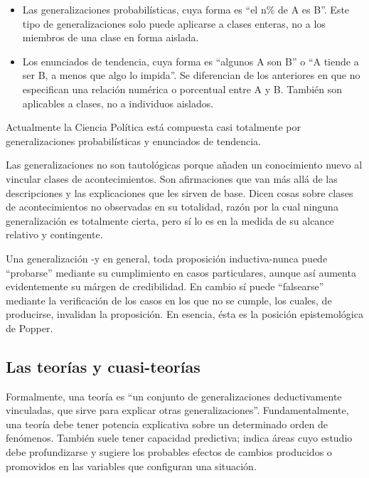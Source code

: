 \documentclass[
]{book}
\begin{document}
\begin{itemize}
\item
  Las generalizaciones probabilísticas, cuya forma es ``el n\% de A es B''. Este tipo de generalizaciones solo puede aplicarse a clases enteras, no a los miembros de una clase en forma aislada.
\item
  Los enunciados de tendencia, cuya forma es ``algunos A son B'' o ``A tiende a ser B, a menos que algo lo impida''. Se diferencian de los anteriores en que no especifican una relación numérica o porcentual entre A y B. También son aplicables a clases, no a individuos aislados.
\end{itemize}

Actualmente la Ciencia Política está compuesta casi totalmente por generalizaciones probabilísticas y enunciados de tendencia.

Las generalizaciones no son tautológicas porque añaden un conocimiento nuevo al vincular clases de acontecimientos. Son afirmaciones que van más allá de las descripciones y las explicaciones que les sirven de base. Dicen cosas sobre clases de acontecimientos no observadas en su totalidad, razón por la cual ninguna generalización es totalmente cierta, pero sí lo es en la medida de su alcance relativo y contingente.

Una generalización -y en general, toda proposición inductiva-nunca puede ``probarse'' mediante su cumplimiento en casos particulares, aunque así aumenta evidentemente su márgen de credibilidad. En cambio sí puede ``falsearse'' mediante la verificación de los casos en los que no se cumple, los cuales, de producirse, invalidan la proposición. En esencia, ésta es la posición epistemológica de Popper.

\hypertarget{las-teoruxedas-y-cuasi-teoruxedas}{%
\subsection*{Las teorías y cuasi-teorías}\label{las-teoruxedas-y-cuasi-teoruxedas}}

Formalmente, una teoría es ``un conjunto de generalizaciones deductivamente vinculadas, que sirve para explicar otras generalizaciones''. Fundamentalmente, una teoría debe tener potencia explicativa sobre un determinado orden de fenómenos. También suele tener capacidad predictiva; indica áreas cuyo estudio debe profundizarse y sugiere los probables efectos de cambios producidos o promovidos en las variables que configuran una situación.
\end{document}
